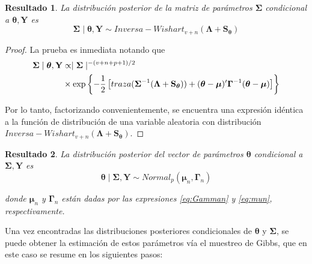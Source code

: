 \documentclass[
  10pt,
  spanish,
]{book}
\newtheorem{proposition}{Resultado}[chapter]
\theoremstyle{definition}
\theoremstyle{definition}
\theoremstyle{definition}
\theoremstyle{definition}
\theoremstyle{remark}
\begin{document}
\begin{proposition}
\protect\hypertarget{prp:unnamed-chunk-35}{}{\label{prp:unnamed-chunk-35} }La distribución posterior de la matriz de parámetros \(\boldsymbol \Sigma\) condicional a \(\boldsymbol \theta,\mathbf{Y}\) es
\begin{equation*}
\label{eq:PosCondbSigma}
\boldsymbol \Sigma\mid \boldsymbol \theta,\mathbf{Y} \sim Inversa-Wishart_{v+n}(\boldsymbol \Lambda+\mathbf{S}_{\boldsymbol \theta})
\end{equation*}
\end{proposition}

\begin{proof}
{}La prueba es inmediata notando que
\begin{align*}
\boldsymbol \Sigma\mid \boldsymbol \theta,\mathbf{Y}&\propto\mid \boldsymbol \Sigma\mid ^{-(v+n+p+1)/2}\notag\\
&\times\exp\left\{ -\frac{1}{2}\left[traza(\boldsymbol \Sigma^{-1}(\boldsymbol \Lambda+\mathbf{S}_{\boldsymbol \theta}))+(\boldsymbol \theta-\boldsymbol \mu)'\boldsymbol \Gamma^{-1}(\boldsymbol \theta-\boldsymbol \mu)\right]\right\}
\end{align*}

Por lo tanto, factorizando convenientemente, se encuentra una expresión idéntica a la función de distribución de una variable aleatoria con distribución \(Inversa-Wishart_{v+n}(\boldsymbol \Lambda+\mathbf{S}_{\boldsymbol \theta})\).
\end{proof}

\begin{proposition}
\protect\hypertarget{prp:unnamed-chunk-37}{}{\label{prp:unnamed-chunk-37} }La distribución posterior del vector de parámetros \(\boldsymbol \theta\) condicional a \(\boldsymbol \Sigma,\mathbf{Y}\) es
\begin{equation}
\label{eq:PosCondbtheta}
\boldsymbol \theta\mid  \boldsymbol \Sigma,\mathbf{Y} \sim Normal_p(\boldsymbol \mu_n,\boldsymbol \Gamma_n)
\end{equation}

donde \(\boldsymbol \mu_n\) y \(\boldsymbol \Gamma_n\) están dadas por las expresiones \eqref{eq:Gamman} y \eqref{eq:mun}, respectivamente.
\end{proposition}

Una vez encontradas las distribuciones posteriores condicionales de \(\boldsymbol \theta\) y \(\boldsymbol \Sigma\), se puede obtener la estimación de estos parámetros vía el muestreo de Gibbs, que en este caso se resume en los siguientes pasos:
\end{document}
